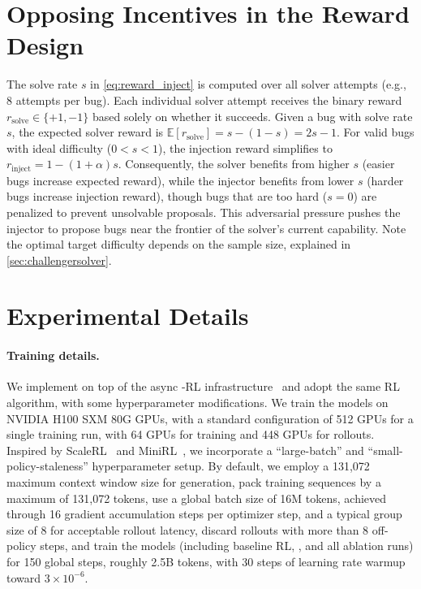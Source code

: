 


\section{Opposing Incentives in the Reward Design}

The solve rate $s$ in \cref{eq:reward_inject} is computed over all solver attempts (e.g., 8 attempts per bug).
Each individual solver attempt receives the binary reward $r_{\text{solve}} \in \{+1, -1\}$ based solely on whether it succeeds. Given a bug with solve rate $s$, the expected solver reward is $\mathbb{E}[r_{\text{solve}}] = s - (1-s) = 2s - 1$.
For valid bugs with ideal difficulty ($0 < s < 1$), the injection reward simplifies to $r_{\text{inject}} = 1 - (1 + \alpha) s$.
Consequently, the solver benefits from higher $s$ (easier bugs increase expected reward), while the injector benefits from lower $s$ (harder bugs increase injection reward), though bugs that are too hard ($s = 0$) are penalized to prevent unsolvable proposals. This adversarial pressure pushes the injector to propose bugs near the frontier of the solver's current capability. Note the optimal target difficulty depends on the sample size, explained in \cref{sec:challengersolver}.

\section{Experimental Details}

\paragraph{Training details.}
We implement \tech on top of the async \cwm-RL infrastructure~\cite{faircodegenteam2025cwmopenweightsllmresearch} and adopt the same RL algorithm, with some hyperparameter modifications.
We train the models on NVIDIA H100 SXM 80G GPUs, with a standard configuration of 512 GPUs for a single training run, with 64 GPUs for training and 448 GPUs for rollouts.
Inspired by ScaleRL~\cite{khatri2025artscalingreinforcementlearning} and MiniRL~\cite{qwenstablerl}, we incorporate a ``large-batch'' and ``small-policy-staleness'' hyperparameter setup.
By default, we employ a 131,072 maximum context window size for generation,
pack training sequences by a maximum of 131,072 tokens,
use a global batch size of 16M tokens, achieved through 16 gradient accumulation steps per optimizer step,
and a typical group size of 8 for acceptable rollout latency,
discard rollouts with more than 8 off-policy steps,
and train the models (including baseline RL, \tech, and all ablation runs) for 150 global steps, roughly 2.5B tokens, with 30 steps of learning rate warmup toward $3\times 10^{-6}$.


